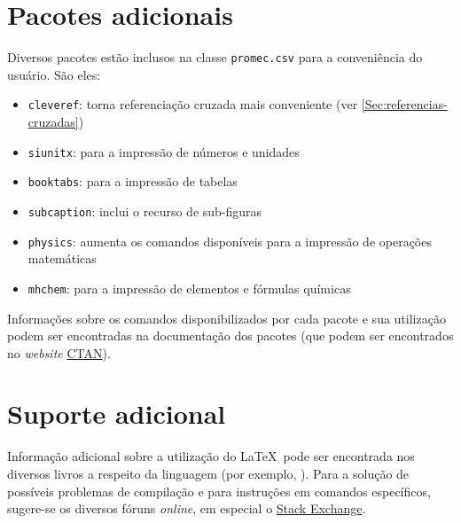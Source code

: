 \section{Pacotes adicionais}
Diversos pacotes estão inclusos na classe \texttt{promec.csv} para a conveniência do usuário. São eles:
\begin{itemize}
    \item \lstinline!cleveref!: torna referenciação cruzada mais conveniente (ver \cref{Sec:referencias-cruzadas})
    \item \lstinline!siunitx!: para a impressão de números e unidades
    \item \lstinline!booktabs!: para a impressão de tabelas
    \item \lstinline!subcaption!: inclui o recurso de sub-figuras
    \item \lstinline!physics!: aumenta os comandos disponíveis para a impressão de operações matemáticas
    \item \lstinline!mhchem!: para a impressão de elementos e fórmulas químicas
\end{itemize}
Informações sobre os comandos disponibilizados por cada pacote e sua utilização podem ser encontradas na documentação dos pacotes (que podem ser encontrados no \textit{website} \href{https://ctan.org/?lang=en}{CTAN}).

\section{Suporte adicional}
Informação adicional sobre a utilização do \LaTeX\ pode ser encontrada nos diversos livros a respeito da linguagem (por exemplo, \citealp{lamport1994latex,oetiker2015not}). Para a solução de possíveis problemas de compilação e para instruções em comandos específicos, sugere-se os diversos fóruns \textit{online}, em especial o \href{https://tex.stackexchange.com/}{Stack Exchange}.

